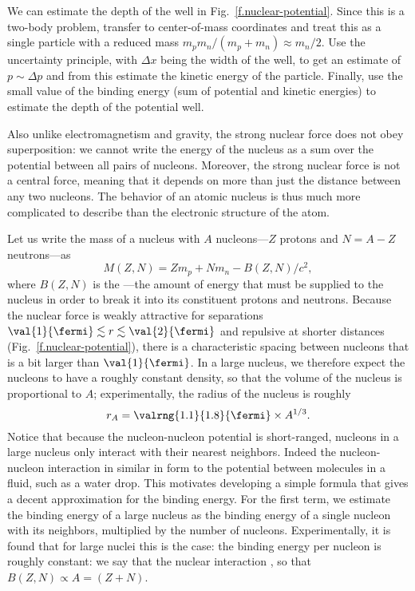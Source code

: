 \begin{exercisebox}
We can estimate the depth of the well in Fig.~\ref{f.nuclear-potential}. Since this is a two-body problem, transfer to center-of-mass coordinates and treat this as a single particle with a reduced mass $m_{p}m_{n}/(m_{p}+m_{n}) \approx m_{n}/2$. Use the uncertainty principle, with $\Delta x$ being the width of the well, to get an estimate of $p\sim\Delta p$ and from this estimate the kinetic energy of the particle. Finally, use the small value of the binding energy (sum of potential and kinetic energies) to estimate the depth of the potential well.
\end{exercisebox}

Also unlike electromagnetism and gravity, the strong nuclear force does not obey superposition: we cannot write the energy of the nucleus as a sum over the potential between all pairs of nucleons. Moreover, the strong nuclear force is not a central force, meaning that it depends on more than just the distance between any two nucleons. The behavior of an atomic nucleus is thus much more complicated to describe than the electronic structure of the atom.

 Let us write the mass of a nucleus with $A$ nucleons---$Z$ protons and $N=A-Z$ neutrons---as
\[
	M(Z,N) = Zm_{p} + Nm_{n} - B(Z,N)/c^{2},
\]
where $B(Z,N)$ is the ---the amount of energy that must be supplied to the nucleus in order to break it into its constituent protons and neutrons.
Because the nuclear force is weakly attractive for separations $\val{1}{\fermi}\lesssim r\lesssim\val{2}{\fermi}$ and repulsive at shorter distances (Fig.~\ref{f.nuclear-potential}), there is a characteristic spacing between nucleons that is a bit larger than $\val{1}{\fermi}$. In a large nucleus, we therefore expect the nucleons to have a roughly constant density, so that the volume of the nucleus is proportional to $A$; experimentally, the radius of the nucleus is roughly
\[
	r_{A} = \valrng{1.1}{1.8}{\fermi}\times A^{1/3}.
\]
Notice that because the nucleon-nucleon potential is short-ranged, nucleons in a large nucleus only interact with their nearest neighbors. Indeed the nucleon-nucleon interaction in similar in form to the potential between molecules in a fluid, such as a water drop. This motivates developing a simple formula that gives a decent approximation for the binding energy. For the first term, we estimate the binding energy of a large nucleus as the binding energy of a single nucleon with its neighbors, multiplied by the number of nucleons. Experimentally, it is found that for large nuclei this is the case: the binding energy per nucleon is roughly constant: we say that the nuclear interaction , so that $B(Z,N) \propto A = (Z+N)$.

